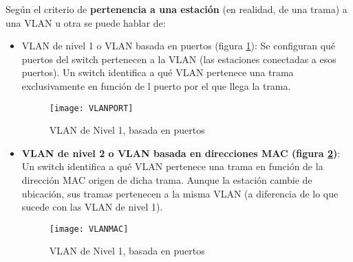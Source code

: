 \documentclass[10pt,portrait, twocolumn]{article}
\begin{document}
Según el criterio de \textbf{pertenencia a una estación} (en realidad, de una trama) a una VLAN u otra se puede hablar de:

	\begin{itemize}
		\item VLAN de nivel 1 o VLAN basada en puertos (figura \ref{fig:VLANPORT}): Se configuran qué puertos del switch pertenecen a la VLAN (las estaciones conectadas a esos puertos). Un switch identifica a qué VLAN pertenece una trama exclusivamente en función de l puerto por el que llega la trama.
		\begin{figure}[!ht]	
			\centering
		    	\texttt{[image: VLANPORT]}
			\caption{VLAN de Nivel 1, basada en puertos}
			\label{fig:VLANPORT}
		\end{figure}  


		\item \textbf{VLAN de nivel 2 o VLAN basada en direcciones MAC (figura \ref{fig:VLANMAC})}: Un switch identifica a qué VLAN pertenece una trama en función de la dirección MAC origen de dicha trama. Aunque la estación cambie de ubicación, sus tramas pertenecen a la misma VLAN (a diferencia de lo que sucede con las VLAN de nivel 1).
			\begin{figure}[!ht]	
			\centering
		    	\texttt{[image: VLANMAC]}
			\caption{VLAN de Nivel 1, basada en puertos}
			\label{fig:VLANMAC}
		\end{figure}  


\end{itemize}
\end{document}
